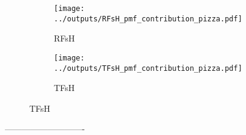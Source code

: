 \begin{figure}[H]
  \caption{Contribuição das espécie nos Fatores para $MP_{2,5}$
  \label{figure:grosso_pmf_contribution_pizza}}
  \begin{subfigure}[b]{0.5\textwidth}
    \texttt{[image: ../outputs/RFsH\_pmf\_contribution\_pizza.pdf]}
    \caption{RFsH}
  \end{subfigure}%
  \begin{subfigure}[b]{0.5\textwidth}
    \texttt{[image: ../outputs/TFsH\_pmf\_contribution\_pizza.pdf]}
    \caption{TFsH}
  \end{subfigure}
\end{figure}

----------------------------

\begin{table}[H]
  \centering
  \caption{RFsH}
  
\end{table}

\begin{table}[H]
  \centering
  \caption{RGsH}
  
\end{table}

\begin{table}[H]
  \centering
  \caption{TGsH}
  
\end{table}


\begin{table}[H]
  \centering
  \caption{TFsH}
  
\end{table}

